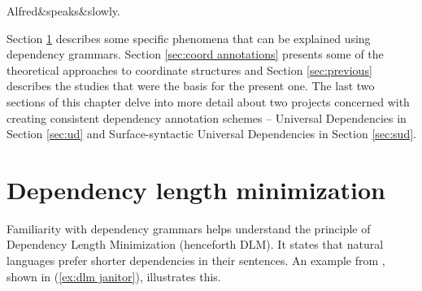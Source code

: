 \begin{exe}
    \ex
    \label{ex:tesniere today}
    \begin{dependency}[theme = simple, baseline=-\the\dimexpr\fontdimen22\textfont2\relax]
    \begin{deptext}
        Alfred\&speaks\&slowly.\\
    \end{deptext}
    \end{dependency}
\end{exe} 

Section \ref{sec:dlm} describes some specific phenomena that can be explained using dependency grammars. Section \ref{sec:coord annotations} presents some of the theoretical approaches to coordinate structures and Section \ref{sec:previous} describes the studies that were the basis for the present one. The last two sections of this chapter delve into more detail about two projects concerned with creating consistent dependency annotation schemes -- Universal Dependencies in Section \ref{sec:ud} and Surface-syntactic Universal Dependencies in Section \ref{sec:sud}. 

\section{Dependency length minimization}\label{sec:dlm}
Familiarity with dependency grammars helps understand the principle of Dependency Length Minimization (henceforth DLM). It states that natural languages prefer shorter dependencies in their sentences. An example from \cite{hp83}, shown in (\ref{ex:dlm janitor}), illustrates this.

